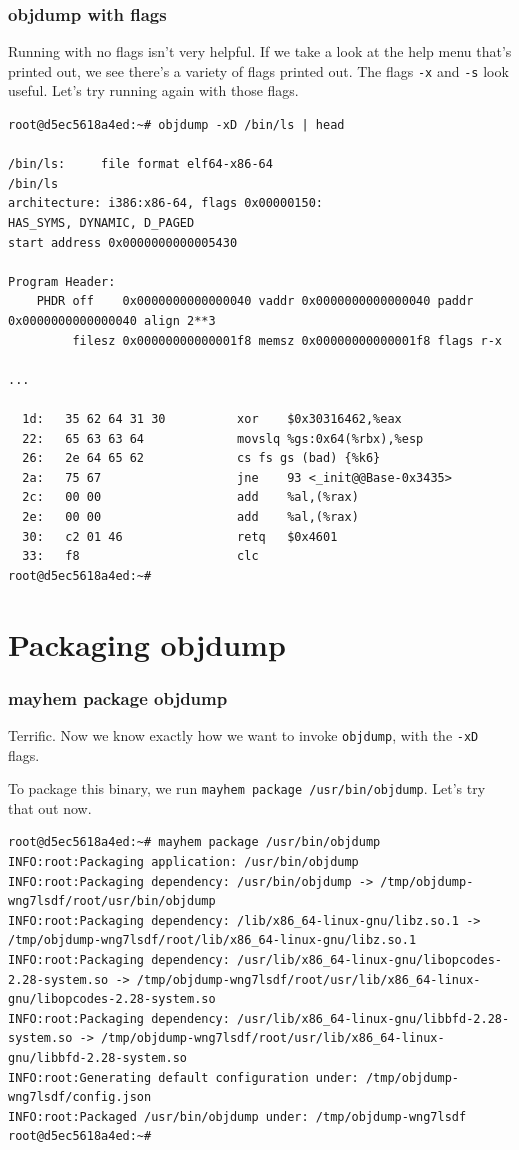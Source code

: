 \documentclass{beamer}
\begin{document}
\begin{frame}[fragile]
\frametitle{objdump with flags}
Running with no flags isn't very helpful. If we take a look at the help menu that's printed out, we see there's a variety of flags printed out. The flags \texttt{-x} and \texttt{-s} look useful. Let's try running again with those flags.

\begin{lstlisting}[basicstyle=\tiny]
root@d5ec5618a4ed:~# objdump -xD /bin/ls | head

/bin/ls:     file format elf64-x86-64
/bin/ls
architecture: i386:x86-64, flags 0x00000150:
HAS_SYMS, DYNAMIC, D_PAGED
start address 0x0000000000005430

Program Header:
    PHDR off    0x0000000000000040 vaddr 0x0000000000000040 paddr 0x0000000000000040 align 2**3
         filesz 0x00000000000001f8 memsz 0x00000000000001f8 flags r-x
         
...
         
  1d:   35 62 64 31 30          xor    $0x30316462,%eax
  22:   65 63 63 64             movslq %gs:0x64(%rbx),%esp
  26:   2e 64 65 62             cs fs gs (bad) {%k6}
  2a:   75 67                   jne    93 <_init@@Base-0x3435>
  2c:   00 00                   add    %al,(%rax)
  2e:   00 00                   add    %al,(%rax)
  30:   c2 01 46                retq   $0x4601
  33:   f8                      clc    
root@d5ec5618a4ed:~# 
\end{lstlisting}
\end{frame}

\section{Packaging objdump}

\begin{frame}[fragile]
\frametitle{mayhem package objdump}
Terrific. Now we know exactly how we want to invoke \texttt{objdump}, with the \texttt{-xD} flags.

To package this binary, we run \texttt{mayhem package /usr/bin/objdump}. Let's try that out now.

\begin{lstlisting}[basicstyle=\tiny]
root@d5ec5618a4ed:~# mayhem package /usr/bin/objdump
INFO:root:Packaging application: /usr/bin/objdump
INFO:root:Packaging dependency: /usr/bin/objdump -> /tmp/objdump-wng7lsdf/root/usr/bin/objdump
INFO:root:Packaging dependency: /lib/x86_64-linux-gnu/libz.so.1 -> /tmp/objdump-wng7lsdf/root/lib/x86_64-linux-gnu/libz.so.1
INFO:root:Packaging dependency: /usr/lib/x86_64-linux-gnu/libopcodes-2.28-system.so -> /tmp/objdump-wng7lsdf/root/usr/lib/x86_64-linux-gnu/libopcodes-2.28-system.so
INFO:root:Packaging dependency: /usr/lib/x86_64-linux-gnu/libbfd-2.28-system.so -> /tmp/objdump-wng7lsdf/root/usr/lib/x86_64-linux-gnu/libbfd-2.28-system.so
INFO:root:Generating default configuration under: /tmp/objdump-wng7lsdf/config.json
INFO:root:Packaged /usr/bin/objdump under: /tmp/objdump-wng7lsdf
root@d5ec5618a4ed:~# 
\end{lstlisting}
\end{frame}
\end{document}
